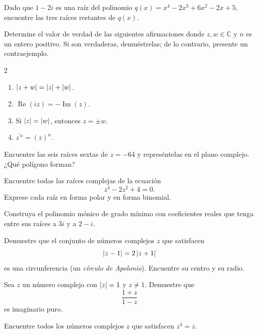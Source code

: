 \begin{prob}
Dado que $1-2i$ es una raíz del polinomio $q(x)=x^4-2x^3+6x^2-2x+5$, encuentre las tres raíces restantes de $q(x)$.
\end{prob}

\begin{prob}
Determine el valor de verdad de las siguientes afirmaciones donde $z, w\in\mathbb{C}$ y $n$ es un entero positivo. Si son verdaderas, demuéstrelas; de lo contrario, presente un contraejemplo.
\begin{multicols}{2}
\begin{enumerate}[$a)$]
\item $\left\vert z+w\right\vert=\left\vert z\right\vert+\left\vert w\right\vert$.
\item $\operatorname{Re}(iz)=-\operatorname{Im}(z)$.
\item Si $\left\vert z\right\vert=\left\vert w\right\vert$, entonces $z=\pm w$.
\item $\overline{z^{\,n}}=\left(\overline{z}\right)^n$.
\end{enumerate}
\end{multicols}
\end{prob}

\begin{prob}
Encuentre las seis raíces sextas de $z=-64$ y represéntelas en el plano complejo. ¿Qué polígono forman?
\end{prob}

\begin{prob}
Encuentre todas las raíces complejas de la ecuación
\[
z^4-2z^2+4=0.
\]
Exprese cada raíz en forma polar y en forma binomial.
\end{prob}

\begin{prob}
Construya el polinomio mónico de grado mínimo con coeficientes reales que tenga entre sus raíces a $3i$ y a $2-i$.
\end{prob}

\begin{prob}
Demuestre que el conjunto de números complejos $z$ que satisfacen
\[
\left\vert z-1\right\vert=2\left\vert z+1\right\vert
\]
es una circunferencia (un \emph{círculo de Apolonio}). Encuentre su centro y su radio.
\end{prob}

\begin{prob}
Sea $z$ un número complejo con $\left\vert z\right\vert=1$ y $z\neq 1$. Demuestre que
\[
\dfrac{1+z}{1-z}
\]
es imaginario puro.
\end{prob}

\begin{prob}
Encuentre todos los números complejos $z$ que satisfacen $z^4=\overline{z}$.
\end{prob}

